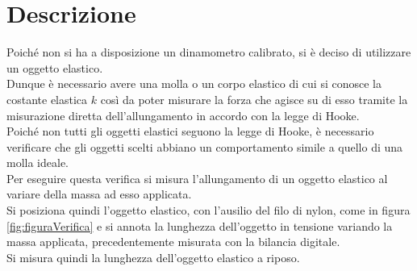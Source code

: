 \section*{Descrizione}

Poiché non si ha a disposizione un dinamometro calibrato, si è deciso di utilizzare un oggetto elastico.\\
Dunque è necessario avere una molla o un corpo elastico di cui si conosce la costante elastica $k$ così da poter misurare la forza
 che agisce su di esso tramite la misurazione diretta dell'allungamento in accordo con la legge di Hooke.\\ 
 Poiché non tutti gli oggetti elastici seguono la legge di Hooke, è necessario verificare che gli oggetti scelti abbiano un comportamento 
 simile a quello di una molla ideale.\\
Per eseguire questa verifica si misura l'allungamento di un oggetto elastico al variare della massa ad esso applicata.\\ 
Si posiziona quindi l'oggetto elastico, con l'ausilio del filo di nylon, come in figura \ref{fig:figuraVerifica} e si annota la lunghezza 
dell'oggetto in tensione variando la massa applicata, precedentemente misurata con la bilancia digitale.\\
Si misura quindi la lunghezza dell'oggetto elastico a riposo.\\
